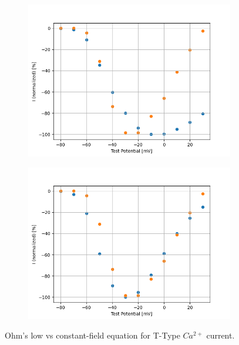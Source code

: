 \documentclass[../../workflow.tex]{subfiles}
\begin{document}
\begin{figure}[H]
    \begin{subfigure}[t]{0.45\textwidth}
        \centering
        \includegraphics[width=\textwidth]{./img/t_type_calcium_channel/simulations/No Scale/Ohm's LawVoltage Step5_IV_Relationship_comparison_Jeong_2015.png}
        \caption{}
        \label{fig_t_type_ohmic_iv_relationship}
    \end{subfigure}
    \hfill
    \begin{subfigure}[t]{0.45\textwidth}
        \centering
        \includegraphics[width=\textwidth]{./img/t_type_calcium_channel/simulations/No Scale/Constant Field EquationVoltage Step5_IV_Relationship_comparison_Jeong_2015.png}
        \caption{}
        \label{fig_t_type_constant_field_iv_relationship}
    \end{subfigure}
    
    \caption{Ohm's low vs constant-field equation for T-Type $Ca^{2+}$ current.}
    \label{fig_t_type_voltage_step_ohmic_vs_constant_field}
\end{figure}
\end{document}
